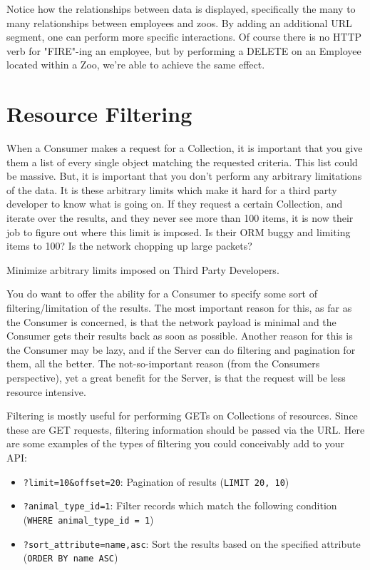 \documentclass{book}
\begin{document}
Notice how the relationships between data is displayed, specifically the many to many relationships between employees and zoos. By adding an additional URL segment, one can perform more specific interactions. Of course there is no HTTP verb for "FIRE"-ing an employee, but by performing a DELETE on an Employee located within a Zoo, we're able to achieve the same effect.


\chapter{Resource Filtering}

When a Consumer makes a request for a Collection, it is important that you give them a list of every single object matching the requested criteria. This list could be massive. But, it is important that you don't perform any arbitrary limitations of the data. It is these arbitrary limits which make it hard for a third party developer to know what is going on. If they request a certain Collection, and iterate over the results, and they never see more than 100 items, it is now their job to figure out where this limit is imposed. Is their ORM buggy and limiting items to 100? Is the network chopping up large packets?

Minimize arbitrary limits imposed on Third Party Developers.

You do want to offer the ability for a Consumer to specify some sort of filtering/limitation of the results. The most important reason for this, as far as the Consumer is concerned, is that the network payload is minimal and the Consumer gets their results back as soon as possible. Another reason for this is the Consumer may be lazy, and if the Server can do filtering and pagination for them, all the better. The not-so-important reason (from the Consumers perspective), yet a great benefit for the Server, is that the request will be less resource intensive.

Filtering is mostly useful for performing GETs on Collections of resources. Since these are GET requests, filtering information should be passed via the URL. Here are some examples of the types of filtering you could conceivably add to your API:

\begin{itemize}
\item \texttt{?limit=10\&offset=20}: Pagination of results (\texttt{LIMIT 20, 10})
\item \texttt{?animal\_type\_id=1}: Filter records which match the following condition (\texttt{WHERE animal\_type\_id = 1})
\item \texttt{?sort\_attribute=name,asc}: Sort the results based on the specified attribute (\texttt{ORDER BY name ASC})
\end{itemize}
\end{document}
